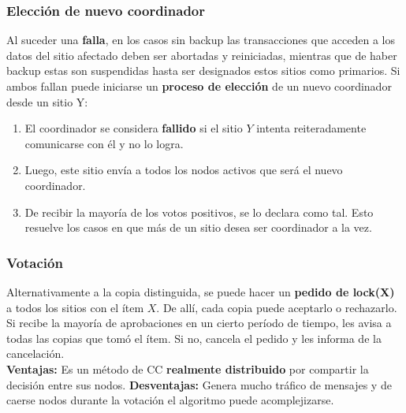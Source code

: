 \subsubsection*{Elección de nuevo coordinador}
Al suceder una \textbf{falla}, en los casos sin backup las transacciones que acceden a los datos del sitio afectado deben ser abortadas y reiniciadas, mientras que de haber backup estas son suspendidas hasta ser designados estos sitios como primarios. Si ambos fallan puede iniciarse un \textbf{proceso de elección} de un nuevo coordinador desde un sitio Y:
\begin{enumerate}
    \item El coordinador se considera \textbf{fallido} si el sitio $Y$ intenta reiteradamente comunicarse con él y no lo logra.
    \item Luego, este sitio envía a todos los nodos activos que será el nuevo coordinador.
    \item De recibir la mayoría de los votos positivos, se lo declara como tal. Esto resuelve los casos en que más de un sitio desea ser coordinador a la vez.
\end{enumerate}

\subsubsection*{Votación}
Alternativamente a la copia distinguida, se puede hacer un \textbf{pedido de lock(X)} a todos los sitios con el ítem $X$. De allí, cada copia puede aceptarlo o rechazarlo. Si recibe la mayoría de aprobaciones en un cierto período de tiempo, les avisa a todas las copias que tomó el ítem. Si no, cancela el pedido y les informa de la cancelación. \\
\textbf{Ventajas:} Es un método de CC \textbf{realmente distribuido} por compartir la decisión entre sus nodos.
\textbf{Desventajas:} Genera mucho tráfico de mensajes y de caerse nodos durante la votación el algoritmo puede acomplejizarse.

